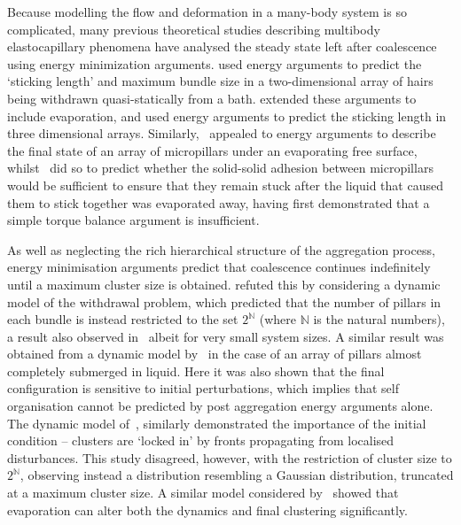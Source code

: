 Because modelling the flow and deformation in a many-body system is so complicated, many previous theoretical studies describing multibody elastocapillary phenomena have analysed the steady state left after coalescence using energy minimization arguments. \cite{Bico2004Nature} used energy arguments to predict the `sticking length' and maximum bundle size in a two-dimensional array of hairs being withdrawn quasi-statically from a bath. \cite{Chandra2009Langmuir, Chandra2010AccChemRes} extended these arguments to include evaporation, and \cite{Py2007EPL} used energy arguments to predict the sticking length in three dimensional arrays. Similarly,~\cite{Chiodi2010EPL} appealed to energy arguments to describe the final state of an array of micropillars under an evaporating free surface, whilst~\cite{Kim2016PhysFluids} did so to predict whether the solid-solid adhesion between micropillars would be sufficient to ensure that they remain stuck after the liquid that caused them to stick together was evaporated away, having first demonstrated that a simple torque balance argument is insufficient.

As well as neglecting the rich hierarchical structure of the aggregation process, energy minimisation arguments predict that coalescence continues indefinitely until a maximum cluster size is obtained. \cite{Gat2013JFM} refuted this by considering a dynamic model of the withdrawal problem, which predicted that the number of pillars in each bundle is instead restricted to the set $2^\mathbb{N}$ (where $\mathbb{N}$ is the natural numbers), a result also observed in~\cite{Pokroy2009Science} albeit for very small system sizes. A similar result was obtained from a dynamic model by~\cite{Wei2015PRSA} in the case of an array of pillars almost completely submerged in liquid. Here it was also shown that the final configuration is sensitive to initial perturbations, which implies that self organisation cannot be predicted by post aggregation energy arguments alone. The dynamic model of~\cite{Singh2014JFM}, similarly demonstrated the importance of the initial condition -- clusters are ‘locked in’ by fronts propagating from localised disturbances. This study disagreed, however, with the restriction of cluster size to $2^\mathbb{N}$, observing instead a distribution resembling a Gaussian distribution, truncated at a maximum cluster size. A similar model considered by~\cite{Hadjittofis2016JFM} showed that evaporation can alter both the dynamics and final clustering significantly.

